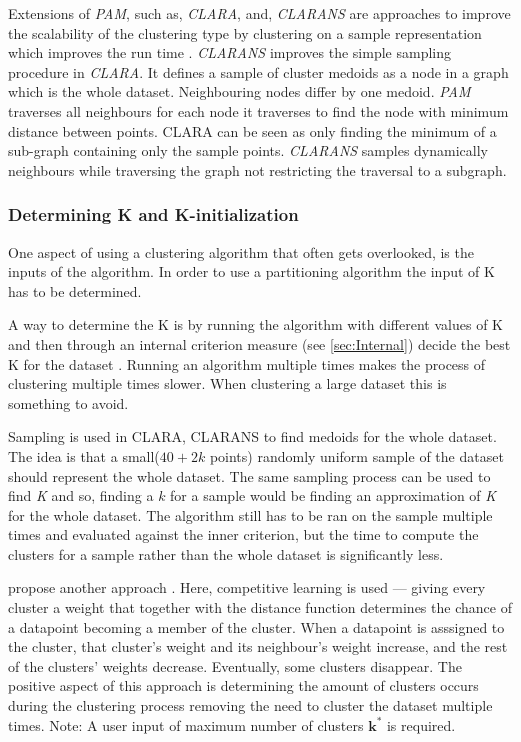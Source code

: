 \documentclass[../report.tex]{subfiles}
\begin{document}
Extensions of \textit{PAM}, such as, \textit{CLARA}, and, \textit{CLARANS} are approaches to improve the scalability of the clustering type by clustering on a sample representation which improves the run time \cite{Ng2002}. \textit{CLARANS} improves the simple sampling procedure in \textit{CLARA}. It defines a sample of cluster medoids as a node in a graph which is the whole dataset. Neighbouring nodes differ by one medoid. \textit{PAM} traverses all neighbours for each node it traverses to find the node with minimum distance between points. CLARA can be seen as only finding the minimum of a sub-graph containing only the sample points. \textit{CLARANS} samples dynamically neighbours while traversing the graph not restricting the traversal to a subgraph.

\subsubsection{Determining K and K-initialization}
One aspect of using a clustering algorithm that often gets overlooked, is the inputs of the algorithm.
In order to use a partitioning algorithm the input of K has to be determined.

A way to determine the K is by running the algorithm with different values of K and then through an internal criterion measure (see \ref{sec:Internal}) decide the best K for the dataset \cite{Huang97clusteringlarge, Sugar2003}. Running an algorithm multiple times makes the process of clustering multiple times slower. When clustering a large dataset this is something to avoid.

Sampling is used in CLARA, CLARANS \cite{Ng2002} to find medoids for the whole dataset. The idea is that a small($40 + 2k$ points) randomly uniform sample of the dataset should represent the whole dataset. The same sampling process can be used to find \textit{K} and so, finding a ${k}$ for a sample would be finding an approximation of \textit{K} for the whole dataset. The algorithm still has to be ran on the sample multiple times and evaluated against the inner criterion, but the time to compute the clusters for a sample rather than the whole dataset is significantly less.

\citeauthor{Cheung2013} propose another approach \cite{Cheung2013, Jia2018}. Here, competitive learning is used --- giving every cluster a weight that together with the distance function determines the chance of a datapoint becoming a member of the cluster. When a datapoint is asssigned to the cluster, that cluster's weight and its neighbour's weight increase, and the rest of the clusters' weights decrease. Eventually, some clusters disappear. The positive aspect of this approach is determining the amount of clusters occurs during the clustering process removing the need to cluster the dataset multiple times. Note: A user input of maximum number of clusters $\mathbf{k^*}$ is required.
\end{document}
